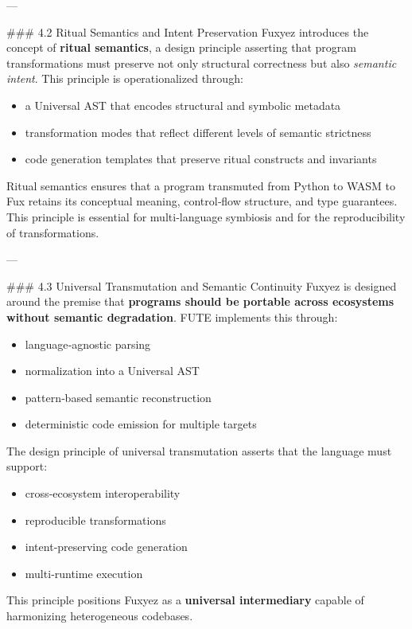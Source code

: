 \documentclass[12pt, a4paper]{book}
\begin{document}
---

\#\#\# 4.2 Ritual Semantics and Intent Preservation  
Fuxyez introduces the concept of \textbf{ritual semantics}, a design principle asserting that program transformations must preserve not only structural correctness but also \textit{semantic intent}. This principle is operationalized through:

\begin{itemize}
  \item a Universal AST that encodes structural and symbolic metadata  
  \item transformation modes that reflect different levels of semantic strictness  
  \item code generation templates that preserve ritual constructs and invariants  
\end{itemize}

Ritual semantics ensures that a program transmuted from Python to WASM to Fux retains its conceptual meaning, control‑flow structure, and type guarantees. This principle is essential for multi‑language symbiosis and for the reproducibility of transformations.

---

\#\#\# 4.3 Universal Transmutation and Semantic Continuity  
Fuxyez is designed around the premise that \textbf{programs should be portable across ecosystems without semantic degradation}. FUTE implements this through:

\begin{itemize}
  \item language‑agnostic parsing  
  \item normalization into a Universal AST  
  \item pattern‑based semantic reconstruction  
  \item deterministic code emission for multiple targets  
\end{itemize}

The design principle of universal transmutation asserts that the language must support:

\begin{itemize}
  \item cross‑ecosystem interoperability  
  \item reproducible transformations  
  \item intent‑preserving code generation  
  \item multi‑runtime execution  
\end{itemize}

This principle positions Fuxyez as a \textbf{universal intermediary} capable of harmonizing heterogeneous codebases.
\end{document}

